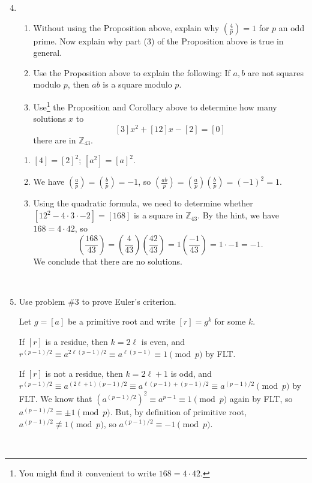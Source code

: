 \documentclass[12pt]{amsart}
\newcommand{\Z}{\mathbb{Z}}
\newcommand{\solution}[1]{\ifthenelse {\equal{\displaysol}{1}} {\begin{framed}{\color{meretale}\noindent #1}\end{framed}} { \ }}
\begin{document}
\begin{enumerate}\setcounter{enumi}{3}
\item \begin{enumerate} 
\item Without using the Proposition above, explain why $\displaystyle\left(\frac{4}{p}\right) = 1$ for $p$ an odd prime. Now explain why part (3) of the Proposition above is true in general.
\item Use the Proposition above to explain the following: If $a,b$ are not squares modulo $p$, then $ab$ is a square modulo $p$.
\item Use\footnote{You might find it convenient to write $168 = 4 \cdot 42$.} the Proposition and Corollary above to determine how many solutions $x$ to \[{[3]x^2 + [12] x - [2] = [0]}\] there are in $\Z_{43}$.
\end{enumerate}

\solution{\begin{enumerate}
\item $[4]=[2]^2$; $[a^2] = [a]^2$.
\item We have $\left( \frac{a}{p} \right) = \left( \frac{b}{p} \right) = -1$, so $\left( \frac{ab}{p} \right) = \left( \frac{a}{p} \right) \left( \frac{b}{p} \right) = (-1)^2 = 1$.
\item Using the quadratic formula, we need to determine whether $[12^2 - 4 \cdot 3 \cdot -2] = [168]$ is a square in $\Z_{43}$. By the hint, we have $168 = 4 \cdot 42$, so \[\left( \frac{168}{43} \right) = \left( \frac{4}{43} \right) \left( \frac{42}{43} \right) = 1 \left( \frac{-1}{43} \right) = 1 \cdot -1 = -1.\]
We conclude that there are no solutions.
\end{enumerate}
}

\item Use problem \#3 to prove Euler's criterion.

\solution{Let $g=[a]$ be a primitive root and write $[r] = g^k$ for some $k$. 

If $[r]$ is a residue, then $k=2\ell$ is even, and $r^{(p-1)/2} \equiv a^{2\ell (p-1)/2 } \equiv a^{\ell (p-1)} \equiv 1 \pmod{p}$ by FLT.

If $[r]$ is not a residue, then $k=2\ell+1$ is odd, and $r^{(p-1)/2} \equiv a^{(2\ell+1) (p-1)/2 } \equiv a^{\ell (p-1) + (p-1)/2} \equiv a^{(p-1)/2} \pmod{p}$ by FLT. We know that $(a^{(p-1)/2})^2 \equiv a^{p-1} \equiv 1 \pmod{p}$ again by FLT, so $a^{(p-1)/2} \equiv \pm 1 \pmod{p}$.
But, by definition of primitive root, $a^{(p-1)/2} \not\equiv 1 \pmod{p}$, so $a^{(p-1)/2} \equiv -1 \pmod{p}$.}


\end{enumerate}
\end{document}
